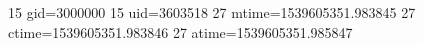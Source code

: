15 gid=3000000
15 uid=3603518
27 mtime=1539605351.983845
27 ctime=1539605351.983846
27 atime=1539605351.985847
